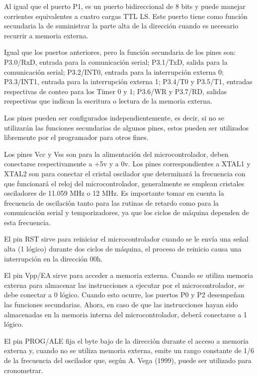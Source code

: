 	 Al igual que el puerto P1, es un puerto bidireccional de 8 bits y puede manejar 
	corrientes equivalentes a cuatro cargas TTL LS. Este puerto tiene como función 
	secundaria la de suministrar la parte alta de la dirección cuando es necesario recurrir a 
	memoria externa. 
	
	 Igual que los puertos anteriores, pero la función secundaria de los pines son: 
	P3.0/RxD, entrada para la comunicación serial; P3.1/TxD, salida para la 
	comunicación serial; P3.2/INT0, entrada para la interrupción externa 0; P3.3/INT1, 
	entrada para la interrupción externa 1; P3.4/T0 y P3.5/T1, entradas respectivas de 
	conteo para los Timer 0 y 1; P3.6/WR y P3.7/RD, salidas respectivas que indican la 
	escritura o lectura de la memoria externa. 
	
	Los pines pueden ser configurados independientemente, es decir, si no se 
	utilizarán las funciones secundarias de algunos pines, estos pueden ser utilizados 
	libremente por el programador para otros fines. 
	
	 Los pines Vcc y Vss son para la alimentación del microcontrolador, deben 
	conectarse respectivamente a +5v y a 0v. Los pines correspondientes a XTAL1 y 
	XTAL2 son para conectar el cristal oscilador que determinará la frecuencia con que 
	funcionará el reloj del microcontrolador, generalmente se emplean cristales 
	osciladores de 11.059 MHz o 12 MHz. Es importante tomar en cuenta la frecuencia 
	de oscilación tanto para las rutinas de retardo como para la comunicación serial y 
	temporizadores, ya que los ciclos de máquina dependen de esta frecuencia. 
	
	 El pin RST sirve para reiniciar el microcontrolador cuando se le envía una 
	señal alta (1 lógico) durante dos ciclos de máquina, el proceso de reinicio causa una 
	interrupción en la dirección 00h. 
	
	 El pin Vpp/EA sirve para acceder a memoria externa. Cuando se utiliza 
	memoria externa para almacenar las instrucciones a ejecutar por el microcontrolador, 
	se debe conectar a 0 lógico. Cuando esto ocurre, los puertos P0 y P2 desempeñan las 
	funciones secundarias. Ahora, en caso de que las instrucciones hayan sido 
	almacenadas en la memoria interna del microcontrolador, deberá conectarse a 1 
	lógico. 
	
	 El pin PROG/ALE fija el byte bajo de la dirección durante el acceso a 
	memoria externa y, cuando no se utiliza memoria externa, emite un rango constante 
	de 1/6 de la frecuencia del oscilador que, según A. Vega (1999), puede ser utilizado 
	para cronometrar. 
	
